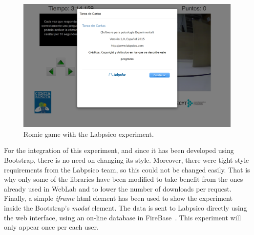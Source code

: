 \begin{figure}[ht]
	\centering
	\includegraphics[height=0.35\textheight]{fig/manuals/trivial/labpsico/labpsico-romie}
	\caption{Romie game with the Labpsico experiment.}
	\label{fig:labpsico_romie}
\end{figure}

For the integration of this experiment, and since it has been developed using Bootstrap, there is no
need on changing its style. Moreover, there were tight style requirements from the Labpsico team, so
this could not be changed easily. That is why only some of the libraries have been modified to take
benefit from the ones already used in WebLab and to lower the number of downloads per request.
Finally, a simple \emph{iframe} \acrshort{html} element has been used to show the experiment inside
the Bootstrap's \emph{modal} element. The data is sent to Labpsico directly using the web interface,
using an on-line database in FireBase~\cite{firebase}. This experiment will only appear once per
each user.
